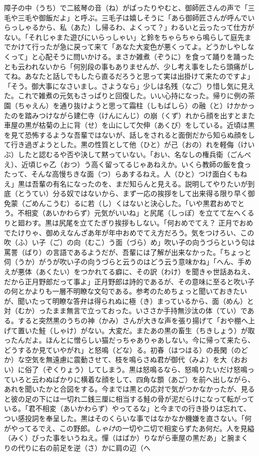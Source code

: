 \documentclass{book}
\begin{document}
障子の中（うち）で二絃琴の音（ね）がぱったりやむと、御師匠さんの声で「三毛や三毛や御飯だよ」と呼ぶ。三毛子は嬉しそうに「あら御師匠さんが呼んでいらっしゃるから、私（あた）し帰るわ、よくって？」わるいと云ったって仕方がない。「それじゃまた遊びにいらっしゃい」と鈴をちゃらちゃら鳴らして庭先までかけて行ったが急に戻って来て「あなた大変色が悪くってよ。どうかしやしなくって」と心配そうに問いかける。まさか雑煮（ぞうに）を食って踊りを踊ったとも云われないから「何別段の事もありませんが、少し考え事をしたら頭痛がしてね。あなたと話しでもしたら直るだろうと思って実は出掛けて来たのですよ」「そう。御大事になさいまし。さようなら」少しは名残（なご）り惜し気に見えた。これで雑煮の元気もさっぱりと回復した。いい心持になった。帰りに例の茶園（ちゃえん）を通り抜けようと思って霜柱（しもばしら）の融（と）けかかったのを踏みつけながら建仁寺（けんにんじ）の崩（くず）れから顔を出すとまた車屋の黒が枯菊の上に背（せ）を山にして欠伸（あくび）をしている。近頃は黒を見て恐怖するような吾輩ではないが、話しをされると面倒だから知らぬ顔をして行き過ぎようとした。黒の性質として他（ひと）が己（おの）れを軽侮（けいぶ）したと認むるや否や決して黙っていない。「おい、名なしの権兵衛（ごんべえ）、近頃じゃ乙（おつ）う高く留ってるじゃあねえか。いくら教師の飯を食ったって、そんな高慢ちきな面（つ）らあするねえ。人（ひと）つけ面白くもねえ」黒は吾輩の有名になったのを、まだ知らんと見える。説明してやりたいが到底（とうてい）分る奴ではないから、まず一応の挨拶をして出来得る限り早く御免蒙（ごめんこうむ）るに若（し）くはないと決心した。「いや黒君おめでとう。不相変（あいかわらず）元気がいいね」と尻尾（しっぽ）を立てて左へくるりと廻わす。黒は尻尾を立てたぎり挨拶もしない。「何おめでてえ？ 正月でおめでたけりゃ、御めえなんざあ年が年中おめでてえ方だろう。気をつけろい、この吹（ふ）い子（ご）の向（むこ）う面（づら）め」吹い子の向うづらという句は罵詈（ばり）の言語であるようだが、吾輩には了解が出来なかった。「ちょっと伺（うか）がうが吹い子の向うづらと云うのはどう云う意味かね」「へん、手めえが悪体（あくたい）をつかれてる癖に、その訳（わけ）を聞きゃ世話あねえ、だから正月野郎だって事よ」正月野郎は詩的であるが、その意味に至ると吹い子の何とかよりも一層不明瞭な文句である。参考のためちょっと聞いておきたいが、聞いたって明瞭な答弁は得られぬに極（き）まっているから、面（めん）と対（むか）ったまま無言で立っておった。いささか手持無沙汰の体（てい）である。すると突然黒のうちの神（かみ）さんが大きな声を張り揚げて「おや棚へ上げて置いた鮭（しゃけ）がない。大変だ。またあの黒の畜生（ちきしょう）が取ったんだよ。ほんとに憎らしい猫だっちゃありゃあしない。今に帰って来たら、どうするか見ていやがれ」と怒鳴（どな）る。初春（はつはる）の長閑（のどか）な空気を無遠慮に震動させて、枝を鳴らさぬ君が御代（みよ）を大（おおい）に俗了（ぞくりょう）してしまう。黒は怒鳴るなら、怒鳴りたいだけ怒鳴っていろと云わぬばかりに横着な顔をして、四角な顋（あご）を前へ出しながら、あれを聞いたかと合図をする。今までは黒との応対で気がつかなかったが、見ると彼の足の下には一切れ二銭三厘に相当する鮭の骨が泥だらけになって転がっている。「君不相変（あいかわらず）やってるな」と今までの行き掛りは忘れて、つい感投詞を奉呈した。黒はそのくらいな事ではなかなか機嫌を直さない。「何がやってるでえ、この野郎。\emph{しゃけ}の一切や二切で相変らずたあ何だ。人を見縊（みく）びった事をいうねえ。憚（はばか）りながら車屋の黒だあ」と腕まくりの代りに右の前足を逆（さ）かに肩の辺（へ
\end{document}
